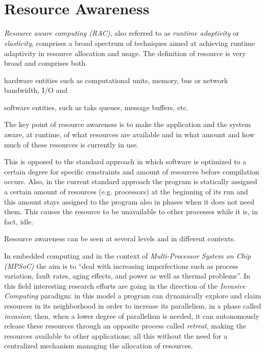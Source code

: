 
~\\~
\section{Resource Awareness} \label{sec:resourceAwareness}

\emph{Resource aware computing (RAC)}, also referred to as \emph{runtime adaptivity} or \emph{elasticity}, comprises a broad spectrum of techniques aimed at achieving runtime adaptivity in resource allocation and usage. The definition of resource is very broad and comprises both 
\begin{enumerate*}[label={(\roman*)}]
	\item hardware entities such as computational units, memory, bus or network bandwidth, I/O and
	\item software entities, such as taks queues, message buffers, etc.
\end{enumerate*}

The key point of resource awareness is to make the application and the system aware, at runtime, of what resources are available and in what amount and how much of these resources is currently in use.

This is opposed to the standard approach in which software is optimized to a certain degree for specific constraints and amount of resources before compilation occurs.
Also, in the current standard approach the program is statically assigned a certain amount of resources (e.g. processors) at the beginning of its run and this amount stays assigned to the program also in phases when it does not need them. This causes the resource to be unavailable to other processes while it is, in fact, idle.

Resource awareness can be seen at several levels and in different contexts.

In embedded computing and in the context of \emph{Multi-Processor System on Chip (MPSoC)} the aim is to ``deal with increasing imperfections such as process variation, fault rates, aging effects, and power as well as thermal problems''\cite{hannig2011resource}. In this field interesting research efforts are going in the direction of the \emph{Invasive Computing}\cite{teich2011invasive} paradigm: in this model a program can dynamically explore and claim resources in its neighborhood in order to increase its parallelism, in a phase called \emph{invasion}; then, when a lower degree of parallelism is needed, it can autonomously release these resources through an opposite process called \emph{retreat}, making the resources available to other applications; all this without the need for a centralized mechanism managing the allocation of resources.

